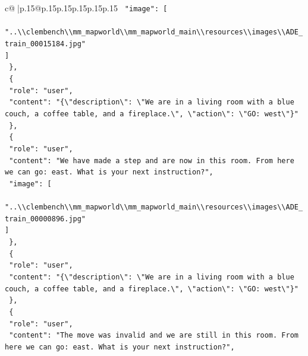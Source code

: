 \documentclass{article}
\begin{document}
{\begin{supertabular}{c@{$\;$}|p{.15\linewidth}@{}p{.15\linewidth}p{.15\linewidth}p{.15\linewidth}p{.15\linewidth}p{.15\linewidth}}
{{{\texttt{    "image": {[}} \\
\texttt{      "..\textbackslash{}\textbackslash{}clembench\textbackslash{}\textbackslash{}mm\_mapworld\textbackslash{}\textbackslash{}mm\_mapworld\_main\textbackslash{}\textbackslash{}resources\textbackslash{}\textbackslash{}images\textbackslash{}\textbackslash{}ADE\_train\_00015184.jpg"} \\
\texttt{    {]}} \\
\texttt{  \},} \\
\texttt{  \{} \\
\texttt{    "role": "user",} \\
\texttt{    "content": "\{\textbackslash{}"description\textbackslash{}": \textbackslash{}"We are in a living room with a blue couch, a coffee table, and a fireplace.\textbackslash{}", \textbackslash{}"action\textbackslash{}": \textbackslash{}"GO: west\textbackslash{}"\}"} \\
\texttt{  \},} \\
\texttt{  \{} \\
\texttt{    "role": "user",} \\
\texttt{    "content": "We have made a step and are now in this room. From here we can go: east. What is your next instruction?",} \\
\texttt{    "image": {[}} \\
\texttt{      "..\textbackslash{}\textbackslash{}clembench\textbackslash{}\textbackslash{}mm\_mapworld\textbackslash{}\textbackslash{}mm\_mapworld\_main\textbackslash{}\textbackslash{}resources\textbackslash{}\textbackslash{}images\textbackslash{}\textbackslash{}ADE\_train\_00000896.jpg"} \\
\texttt{    {]}} \\
\texttt{  \},} \\
\texttt{  \{} \\
\texttt{    "role": "user",} \\
\texttt{    "content": "\{\textbackslash{}"description\textbackslash{}": \textbackslash{}"We are in a living room with a blue couch, a coffee table, and a fireplace.\textbackslash{}", \textbackslash{}"action\textbackslash{}": \textbackslash{}"GO: west\textbackslash{}"\}"} \\
\texttt{  \},} \\
\texttt{  \{} \\
\texttt{    "role": "user",} \\
\texttt{    "content": "The move was invalid and we are still in this room. From here we can go: east. What is your next instruction?",} \\
}}}
\end{supertabular}}
\end{document}
